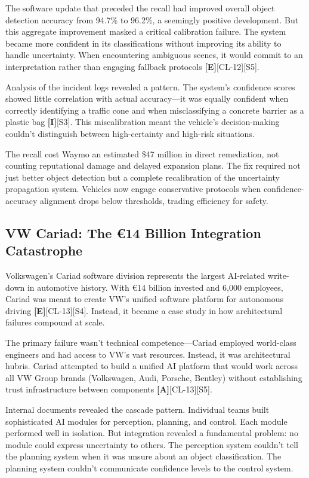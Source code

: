 \documentclass[a4paper,11pt]{article}
\newcommand{\elabel}{\textbf{\textcolor{ecolor}{[E]}}}
\newcommand{\ilabel}{\textbf{\textcolor{icolor}{[I]}}}
\newcommand{\alabel}{\textbf{\textcolor{acolor}{[A]}}}
\begin{document}
The software update that preceded the recall had improved overall object detection accuracy from 94.7\% to 96.2\%, a seemingly positive development. But this aggregate improvement masked a critical calibration failure. The system became more confident in its classifications without improving its ability to handle uncertainty. When encountering ambiguous scenes, it would commit to an interpretation rather than engaging fallback protocols \elabel{}[CL-12]\textcolor{primary}{[S5]}.


Analysis of the incident logs revealed a pattern. The system's confidence scores showed little correlation with actual accuracy—it was equally confident when correctly identifying a traffic cone and when misclassifying a concrete barrier as a plastic bag \ilabel{}\textcolor{primary}{[S3]}. This miscalibration meant the vehicle's decision-making couldn't distinguish between high-certainty and high-risk situations.


The recall cost Waymo an estimated \$47 million in direct remediation, not counting reputational damage and delayed expansion plans. The fix required not just better object detection but a complete recalibration of the uncertainty propagation system. Vehicles now engage conservative protocols when confidence-accuracy alignment drops below thresholds, trading efficiency for safety.


\subsection{VW Cariad: The €14 Billion Integration Catastrophe}

Volkswagen's Cariad software division represents the largest AI-related write-down in automotive history. With €14 billion invested and 6,000 employees, Cariad was meant to create VW's unified software platform for autonomous driving \elabel{}[CL-13]\textcolor{primary}{[S4]}. Instead, it became a case study in how architectural failures compound at scale.


The primary failure wasn't technical competence—Cariad employed world-class engineers and had access to VW's vast resources. Instead, it was architectural hubris. Cariad attempted to build a unified AI platform that would work across all VW Group brands (Volkswagen, Audi, Porsche, Bentley) without establishing trust infrastructure between components \alabel{}[CL-13]\textcolor{primary}{[S5]}.


Internal documents revealed the cascade pattern. Individual teams built sophisticated AI modules for perception, planning, and control. Each module performed well in isolation. But integration revealed a fundamental problem: no module could express uncertainty to others. The perception system couldn't tell the planning system when it was unsure about an object classification. The planning system couldn't communicate confidence levels to the control system.
\end{document}
